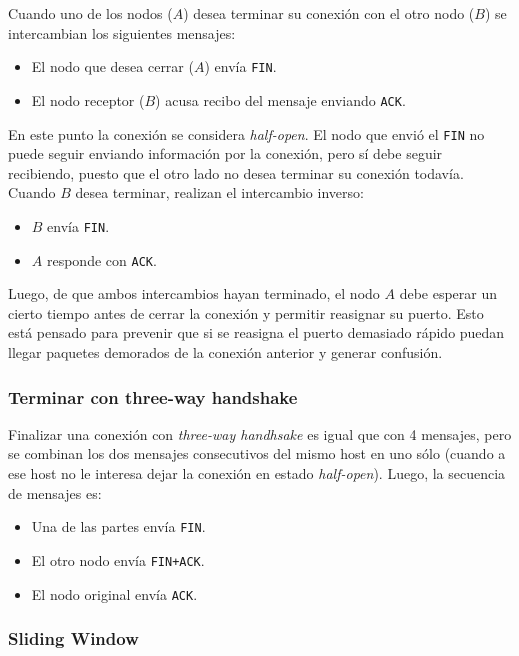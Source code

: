 \documentclass[]{article}
\begin{document}
Cuando uno de los nodos ($A$) desea terminar su conexión con el otro nodo ($B$) se intercambian los siguientes mensajes:
\begin{itemize}
    \item El nodo que desea cerrar ($A$) envía \texttt{FIN}.
    \item El nodo receptor ($B$) acusa recibo del mensaje enviando \texttt{ACK}.
\end{itemize}

En este punto la conexión se considera \emph{half-open}. El nodo que envió el \texttt{FIN} no puede seguir enviando información por la conexión, pero sí debe seguir recibiendo, puesto que el otro lado no desea terminar su conexión todavía. Cuando $B$ desea terminar, realizan el intercambio inverso:
\begin{itemize}
    \item $B$ envía \texttt{FIN}.
    \item $A$ responde con \texttt{ACK}.
\end{itemize}

Luego, de que ambos intercambios hayan terminado, el nodo $A$ debe esperar un cierto tiempo antes de cerrar la conexión y permitir reasignar su puerto. Esto está pensado para prevenir que si se reasigna el puerto demasiado rápido puedan llegar paquetes demorados de la conexión anterior y generar confusión.

\subsubsection{Terminar con three-way handshake}
Finalizar una conexión con \emph{three-way handhsake} es igual que con 4 mensajes, pero se combinan los dos mensajes consecutivos del mismo host en uno sólo (cuando a ese host no le interesa dejar la conexión en estado \emph{half-open}). Luego, la secuencia de mensajes es:
\begin{itemize}
    \item Una de las partes envía \texttt{FIN}.
    \item El otro nodo envía \texttt{FIN+ACK}.
    \item El nodo original envía \texttt{ACK}.
\end{itemize}


\subsubsection{Sliding Window}

\end{document}
